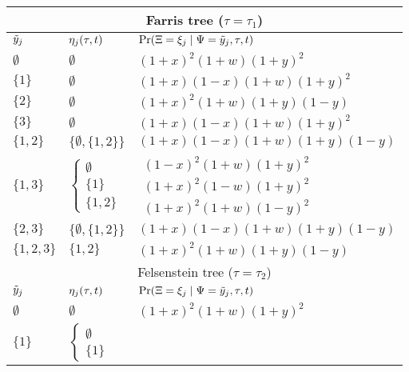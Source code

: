 \begin{table}
\centering
\begin{tabular}{|l|ll|}
    \multicolumn{3}{c}{Farris tree ($\tau=\tau_1$)}\\
    \hline
    $\tilde{y}_j$    & $\eta_j(\tau, t)$ & $\Pr(\Xi=\xi_j \mid \Psi=\tilde{y}_j,\tau,t)$\\
    \hline
    $\emptyset$&
    $\emptyset$&
    $(1+x)^2   (1+w)(1+y)^2$\\
     $\{1\}$    &
    $\emptyset$&
    $(1+x)(1-x)(1+w)(1+y)^2$\\
     $\{2\}$    &
    $\emptyset$&
    $(1+x)^2   (1+w)(1+y)(1-y)$\\
     $\{3\}$    &
    $\emptyset$&
    $(1+x)(1-x)(1+w)(1+y)^2$\\
    $\{1,2\}$  &
    $\{\emptyset,\{1,2\}\}$&
    $(1+x)(1-x)(1+w)(1+y)(1-y)$\\
    $\{1,3\}$  &
    $\left\{\begin{array}{l}
                    \emptyset\\
                    \{1\}\\
                    \{1,2\}
                \end{array}\right.$&
    $\begin{array}{l}
                    (1-x)^2   (1+w)(1+y)^2\\
                    (1+x)^2   (1-w)(1+y)^2\\
                    (1+x)^2   (1+w)(1-y)^2
                \end{array}$\\
    $\{2,3\}$  &
                $\{\emptyset,\{1,2\}\}$&
                $(1+x)(1-x)(1+w)(1+y)(1-y)$\\
    $\{1,2,3\}$&
                $\{1,2\}$&
                $(1+x)^2   (1+w)(1+y)(1-y)$\\
    \hline
    \multicolumn{3}{c}{Felsenstein tree ($\tau=\tau_2$)}\\
    \hline
    $\tilde{y}_j$    & $\eta_j(\tau, t)$ & $\Pr(\Xi=\xi_j \mid \Psi=\tilde{y}_j,\tau,t)$\\
    \hline
    $\emptyset$       &$\emptyset$&$(1+x)^2   (1+w)(1+y)^2$\\
    $\{1\}$          &
    $\left\{\begin{array}{l}
                    \emptyset\\
                    \{1\}
                \end{array}\right.$&

\end{tabular}
\end{table}
